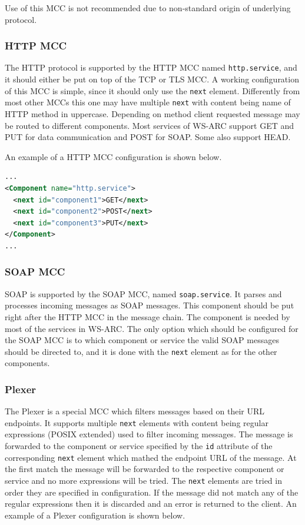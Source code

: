 \documentclass{article}
\begin{document}
Use of this MCC is not recommended due to non-standard origin of underlying
protocol.

\subsubsection{HTTP MCC}\label{sec:http-mcc}
The HTTP protocol is supported by the HTTP MCC named \texttt{http.service}, and
it should either be put on top of the TCP or TLS MCC. A working configuration of
this MCC is simple, since it should only use the \texttt{next} element.
Differently from most other MCCs this one may have multiple \texttt{next} with
content being name of HTTP method in uppercase. Depending on method client
requested message may be routed to different components. Most services
of WS-ARC support GET and PUT for data communication and POST for SOAP. Some
also support HEAD.

An example of a HTTP MCC configuration is shown below.

\begin{lstlisting}[language=xml]
...
<Component name="http.service">
  <next id="component1">GET</next>
  <next id="component2">POST</next>
  <next id="component3">PUT</next>
</Component>
...
\end{lstlisting}

\subsubsection{SOAP MCC}\label{sec:soap-mcc}
SOAP is supported by the SOAP MCC, named \texttt{soap.service}. It parses and
processes incoming messages as SOAP messages. This component should be put right
after the HTTP MCC in the message chain. The component is needed by most of the
services in WS-ARC. The only option which should be configured for the SOAP MCC
is to which component or service the valid SOAP messages should be directed to,
and it is done with the \texttt{next} element as for the other components.

\subsubsection{Plexer}\label{sec:plexer}
The Plexer is a special MCC which filters messages based on their URL endpoints.
It supports multiple \texttt{next} elements with content being regular expressions
(POSIX extended) used to filter incoming messages.
The message is forwarded to the component or service specified by the \texttt{id}
attribute of the corresponding \texttt{next} element which mathed the endpoint
URL of the message. At the first match the message will be forwarded to the
respective component or service and no more expressions will be tried. The
\texttt{next} elements are tried in order they are specified in configuration.
If the message did not match any of the regular expressions then it is discarded
and an error is returned to the client. An example of a Plexer configuration is
shown below.
\end{document}
